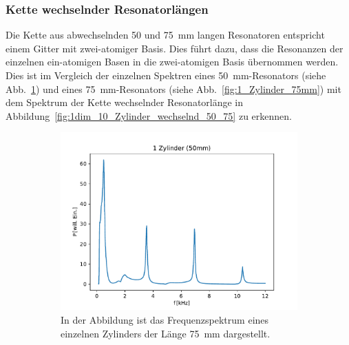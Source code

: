         \subsubsection*{Kette wechselnder Resonatorlängen}
            Die Kette aus abwechselnden 50 und \SI{75}{\milli\metre} langen Resonatoren entspricht einem Gitter mit zwei-atomiger Basis. Dies führt dazu, dass die Resonanzen der einzelnen ein-atomigen Basen
            in die zwei-atomigen Basis  übernommen werden. Dies ist im Vergleich der einzelnen Spektren eines \SI{50}{\milli\metre}-Resonators (siehe Abb.~\ref{fig:1_Zylinder_50mm}) und eines 
            \SI{75}{\milli\metre}-Resonators (siehe Abb.~\ref{fig:1_Zylinder_75mm}) mit dem Spektrum der Kette wechselnder Resonatorlänge in Abbildung~\ref{fig:1dim_10_Zylinder_wechselnd_50_75} zu erkennen.
            \FloatBarrier
            \begin{figure}[ht]
                \centering
                \begin{subfigure}[b]{0.45\textwidth}
                    \centering
                    \includegraphics[scale=0.45]{./pictures/1_Zylinder_50mm.pdf}
                    \caption{In der Abbildung ist das Frequenzspektrum eines einzelnen Zylinders der Länge \SI{75}{\milli\metre} dargestellt.}
                    \label{fig:1_Zylinder_50mm}
                \end{subfigure}
                \hfill
                \centering
                \begin{subfigure}[b]{0.45\textwidth}
                    \centering

\end{subfigure}
\end{figure}
